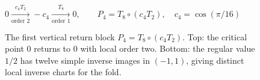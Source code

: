 \begin{figure}[htbp]
\centering
\(\displaystyle
 0 \xrightarrow[\text{order }2]{\,c_4T_2\,} -c_4
   \xrightarrow[\text{order }1]{\,T_8\,} 0,
 \qquad
 P_4=T_8\circ(c_4T_2),\quad c_4=\cos(\pi/16)
\)\par\medskip
{}
\caption{The first vertical return block \(P_4=T_8\circ(c_4T_2)\). Top: the critical point \(0\) returns to \(0\) with local order two. Bottom: the regular value \(1/2\) has twelve simple inverse images in \((-1,1)\), giving distinct local inverse charts for the fold.}
\label{fig:fold-block}
\end{figure}
